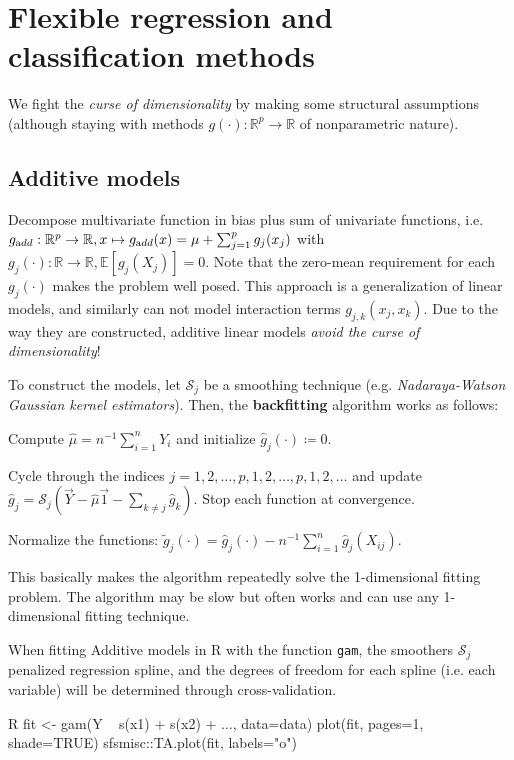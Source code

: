 \section{Flexible regression and classification methods}\label{sec:flexible_regression_and_classification_methods}
We fight the \emph{curse of dimensionality} by making some structural assumptions (although staying with methods $g(\cdot): \mathbb{R}^p \to \mathbb{R}$ of nonparametric nature).
\subsection{Additive models}%
\label{sub:additive_models}
\begin{sectionbox}\nospacing{}
  Decompose multivariate function in bias plus sum of univariate functions, i.e. $g_{\textrm add}: \mathbb{R}^p\to\mathbb{R}, x\mapsto g_{\textrm add}(x) = \mu + \sum_{j=1}^pg_j(x_j)$ with $g_j(\cdot): \mathbb{R}\to\mathbb{R}, \mathbb{E}[g_j(X_j)]=0$.
  Note that the zero-mean requirement for each $g_j(\cdot)$ makes the problem well posed.
  This approach is a generalization of linear models, and similarly can not model interaction terms $g_{j,k}(x_j, x_k)$.
  Due to the way they are constructed, additive linear models \emph{avoid the curse of dimensionality}!
\end{sectionbox}
\begin{sectionbox}\nospacing{}
  To construct the models, let $\mathcal{S}_j$ be a smoothing technique (e.g. \emph{Nadaraya-Watson Gaussian kernel estimators}).
  Then, the \textbf{backfitting} algorithm works as follows:
  \begin{itemizenosep}
    \item Compute $\hat \mu = n^{-1}\sum_{i=1}^n Y_i$ and initialize $\hat g_j(\cdot) \coloneqq 0$.
    \item Cycle through the indices $j = 1,2,\dots,p,1,2,\dots,p,1,2,\dots$ and update
      $\hat g_j=\mathcal{S}_j(\vec{Y}-\hat \mu\vec{1}-\sum_{k\neq j}\hat g_k)$.
      Stop each function at convergence.
    \item Normalize the functions: $\tilde g_j(\cdot) = \hat g_j(\cdot) - n^{-1}\sum_{i=1}^n\hat g_j(X_{ij})$.
  \end{itemizenosep}
  This basically makes the algorithm repeatedly solve the 1-dimensional fitting problem.
  The algorithm may be slow but often works and can use any 1-dimensional fitting technique.
\end{sectionbox}
\begin{sectionbox}\nospacing{}
  When fitting Additive models in R with the function \verb!gam!, the smoothers $\mathcal{S}_j$ penalized regression spline, and the degrees of freedom for each spline (i.e. each variable) will be determined through cross-validation.

  \begin{mintlinebox}{R}
    fit <- gam(Y ~ s(x1) + s(x2) + ..., data=data)
    plot(fit, pages=1, shade=TRUE)
    sfsmisc::TA.plot(fit, labels="o")
  \end{mintlinebox}
\end{sectionbox}

